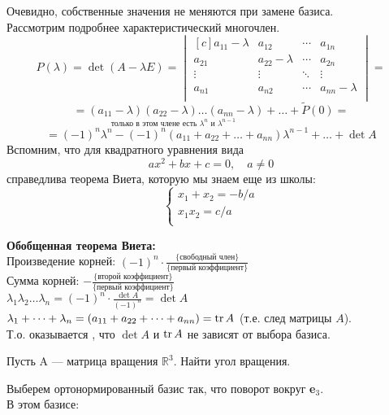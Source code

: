 Очевидно, собственные значения не меняются при замене базиса.\\

Рассмотрим подробнее характеристический многочлен.
$$
P(\lambda)=\det (A-\lambda E)=
\begin{vmatrix*}[c]
 a_{11}-\lambda & a_{12} & \cdots & a_{1n}\\
 a_{21} & a_{22}-\lambda & \cdots & a_{2n}\\
 \vdots & \vdots & \ddots & \vdots \\
 a_{n1} & a_{n2} & \cdots & a_{nn}-\lambda\\
\end{vmatrix*}
=
$$
$$
=\underset{\text{только в этом члене есть $\lambda^{n}$ и $\lambda^{n-1}$ }}
{( a_{11}-\lambda)(a_{22}-\lambda)\dots ( a_{nn}-\lambda)} + \dots + \tilde P(0)=
$$
$$
=(-1)^{n}\lambda^{n}-(-1)^{n}( a_{11}+a_{22}+\dots+a_{nn})\lambda^{n-1}+\dots+\det A
$$
Вспомним, что для квадратного уравнения вида 
$$ax^{2}+bx+c=0,\quad a\neq 0$$
справедлива теорема Виета, которую мы знаем еще из школы:
$$\left\{
\begin{aligned}
x_{1}+x_{2}=-b/a\\
x_{1}x_{2}=c/a\\
\end{aligned}
\right.$$

\textbf{Обобщенная теорема Виета:}\\
Произведение корней: $(-1)^{n}\cdot \frac{\{ \text{свободный член}\}}{\{ \text{первый коэффициент}\}}$\\
Сумма корней: $-\frac{\{ \text{второй коэффициент}\}}{\{ \text{первый коэффициент}\}}$\\
$\lambda_{1}\lambda_{2}\dots \lambda_{n}=(-1)^{n}\cdot \frac{\det A}{(-1)^{n}}=\det A$\\
$\lambda_{1}+ \dots + \lambda_{n}=(a_{11}+a_{22}+\dots+a_{nn})=\operatorname{\mathop{tr}} A$ (т.е. след матрицы $A$).\\
Т.о. оказывается , что $\det A$ и $\operatorname{\mathop{tr}} A$ не зависят от выбора базиса.
\begin{prim}
Пусть A --- матрица вращения $\mathbb{R}^{3}$. Найти угол вращения.
\end{prim}
Выберем ортонормированный базис так, что поворот вокруг \textbf{e$_{3}$}.\\
В этом базисе: